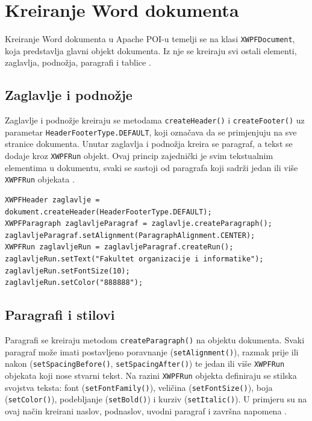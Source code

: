 \documentclass[]{foi}
\begin{document}
\section{Kreiranje Word dokumenta}

Kreiranje Word dokumenta u Apache POI-u temelji se na klasi \texttt{XWPFDocument}, koja predstavlja glavni objekt dokumenta. Iz nje se kreiraju svi ostali elementi, zaglavlja, podnožja, paragrafi i tablice \cite{apacheXWPFQuickGuide}.

\subsection{Zaglavlje i podnožje}

Zaglavlje i podnožje kreiraju se metodama \texttt{createHeader()} i \texttt{createFooter()} uz parametar \texttt{HeaderFooterType.DEFAULT}, koji označava da se primjenjuju na sve stranice dokumenta. Unutar zaglavlja i podnožja kreira se paragraf, a tekst se dodaje kroz \texttt{XWPFRun} objekt. Ovaj princip zajednički je svim tekstualnim elementima u dokumentu, svaki se sastoji od paragrafa koji sadrži jedan ili više \texttt{XWPFRun} objekata \cite{apacheXWPFQuickGuide}.

\begin{lstlisting}[style=java, caption={Obrada Word dokumenta}]
XWPFHeader zaglavlje = dokument.createHeader(HeaderFooterType.DEFAULT);
XWPFParagraph zaglavljeParagraf = zaglavlje.createParagraph();
zaglavljeParagraf.setAlignment(ParagraphAlignment.CENTER);
XWPFRun zaglavljeRun = zaglavljeParagraf.createRun();
zaglavljeRun.setText("Fakultet organizacije i informatike");
zaglavljeRun.setFontSize(10);
zaglavljeRun.setColor("888888");
\end{lstlisting}

\subsection{Paragrafi i stilovi}

{\sloppy
Paragrafi se kreiraju metodom \texttt{createParagraph()} na objektu dokumenta. Svaki paragraf može imati postavljeno poravnanje (\texttt{setAlignment()}), razmak prije ili nakon (\texttt{setSpacingBefore()}, \texttt{setSpacingAfter()}) te jedan ili više \texttt{XWPFRun} objekata koji nose stvarni tekst. Na razini \texttt{XWPFRun} objekta definiraju se stilska svojstva teksta: font (\texttt{setFontFamily()}), veličina (\texttt{setFontSize()}), boja (\texttt{setColor()}), podebljanje (\texttt{setBold()}) i kurziv (\texttt{setItalic()}). U primjeru su na ovaj način kreirani naslov, podnaslov, uvodni paragraf i završna napomena \cite{apacheXWPFQuickGuide}.
\par}
\end{document}
